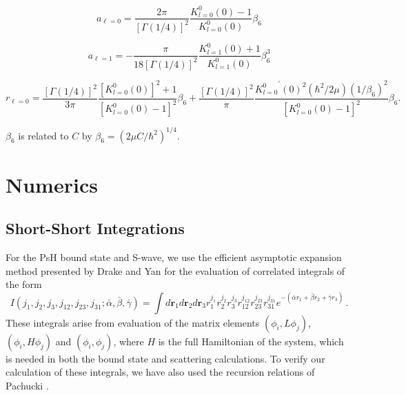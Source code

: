 \documentclass[preprint,showpacs,preprintnumbers,amsmath,amssymb]{revtex4}
\newcommand{\todoi}{\todo[inline]}
\begin{document}
\begin{equation}
\label{eq:GaoScatLenS}
a_{\ell=0} = \frac{2\pi}{[\Gamma(1/4)]^2} \frac{K_{l=0}^0(0) - 1}{K_{l=0}^0(0)} \beta_6
\end{equation}

\begin{equation}
\label{eq:GaoScatLenP}
a_{\ell=1} = -\frac{\pi}{18[\Gamma(1/4)]^2} \frac{K_{l=1}^0(0) + 1}{K_{l=1}^0(0)} \beta_6^3
\end{equation}

\begin{equation}
\label{eq:GaoEffRange}
r_{\ell=0} = \frac{[\Gamma(1/4)]^2}{3\pi} \frac{[K_{l=0}^0(0)]^2 + 1}{[K_{l=0}^0(0) - 1]^2} \beta_6 + \frac{[\Gamma(1/4)]^2}{\pi} \frac{{K_{l=0}^0}^\prime(0)^2(\hbar^2/2\mu)(1/\beta_6)^2}{[K_{l=0}^0(0) - 1]^2} \beta_6.
\end{equation}

$\beta_6$ is related to $C$ by $\beta_6 = (2\mu C/\hbar^2)^{1/4}$.


\section{Numerics}
\label{sec:Numerical}

\subsection{Short-Short Integrations}
\label{sec:ShortInt}
For the PsH bound state and S-wave, we use the efficient asymptotic expansion method presented by Drake and Yan \cite{Drake1995} for the evaluation of correlated integrals of the form
\begin{equation}
\label{eq:ShortInt}
I(j_1,j_2,j_3,j_{12},j_{23},j_{31}; \bar{\alpha}, \bar{\beta}, \bar{\gamma}) =
\int
d \textbf{r}_1 d \textbf{r}_2 d \textbf{r}_3
r_1^{j_1} r_2^{j_2} r_3^{j_3} r_{12}^{j_{12}}
r_{23}^{j_{23}} r_{31}^{j_{31}}
e^{-(\bar{\alpha} r_1 + \bar{\beta} r_2 + \bar{\gamma} r_3)}\, .
\end{equation}
These integrals arise from evaluation of the matrix elements $(\phi_i, L \phi_j)$, $(\phi_i, H \phi_j)$ and $(\phi_i, \phi_j)$, where $H$ is the full Hamiltonian of the system,
which is needed in both the bound state and scattering calculations. To verify our calculation of these integrals, we have also used the recursion relations of Pachucki \cite{Pachucki2004}.
\end{document}
